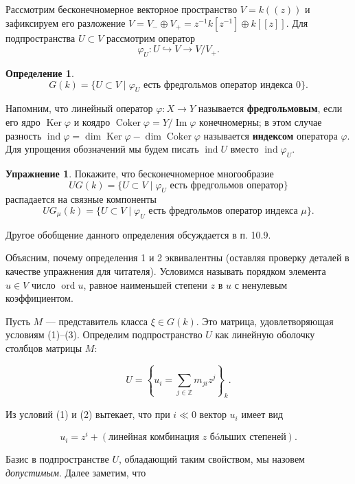 \documentclass{article}
\theoremstyle{definition}
\theoremstyle{definition} %
\newtheorem{definition}{Определение}[section]
\theoremstyle{remark}     %
\theoremstyle{definition}
\theoremstyle{definition}
\theoremstyle{definition}
\theoremstyle{definition}
\theoremstyle{definition}
\theoremstyle{definition}
\theoremstyle{definition}
\theoremstyle{definition}
\newtheorem{exercise}{Упражнение}[section]
\begin{document}
Рассмотрим бесконечномерное векторное пространство \( V = k((z)) \) и зафиксируем его разложение \( V = V_- \oplus V_+ = z^{-1}k[z^{-1}] \oplus k[[z]] \). Для подпространства \( U \subset V \) рассмотрим оператор
\[
\varphi_U : U \hookrightarrow V \to V/V_+.
\]

\begin{definition}
  \[
    G(k) = \{ U \subset V \mid \varphi_U \text{ есть фредгольмов оператор индекса } 0 \}.
  \]
\end{definition}

Напомним, что линейный оператор \( \varphi : X \to Y \) называется \textbf{фредгольмовым}, если его ядро \( \operatorname{Ker} \varphi \) и коядро \( \operatorname{Coker} \varphi = Y / \operatorname{Im} \varphi \) конечномерны; в этом случае разность \( \operatorname{ind} \varphi = \dim \operatorname{Ker} \varphi - \dim \operatorname{Coker} \varphi \) называется \textbf{индексом} оператора \( \varphi \). Для упрощения обозначений мы будем писать \( \operatorname{ind} U \) вместо \( \operatorname{ind} \varphi_U \).

\begin{exercise}
  Покажите, что бесконечномерное многообразие
  \[
    UG(k) = \{ U \subset V \mid \varphi_U \text{ есть фредгольмов оператор} \}
  \]
  распадается на связные компоненты
  \[
    UG_\mu(k) = \{ U \subset V \mid \varphi_U \text{ есть фредгольмов оператор индекса } \mu \}.
  \]
\end{exercise}



Другое обобщение данного определения обсуждается в п. 10.9.

Объясним, почему определения 1 и 2 эквивалентны (оставляя проверку деталей в качестве упражнения для читателя). Условимся называть порядком элемента \( u \in V \) число \(\operatorname{ord} u\), равное наименьшей степени \( z \) в \( u \) с ненулевым коэффициентом.

Пусть \( M \) — представитель класса \( \xi \in G(k) \). Это матрица, удовлетворяющая условиям (1)–(3). Определим подпространство \( U \) как линейную оболочку столбцов матрицы \( M \):

\[
U = \left\{ u_i = \sum_{j \in \mathbb{Z}} m_{ji} z^j \right\}_k .
\]

Из условий (1) и (2) вытекает, что при \( i \ll 0 \) вектор \( u_i \) имеет вид

\[
u_i = z^i + (\text{линейная комбинация } z \text{ бóльших степеней}).
\]

Базис в подпространстве \( U \), обладающий таким свойством, мы назовем \textit{допустимым}. Далее заметим, что
\end{document}
